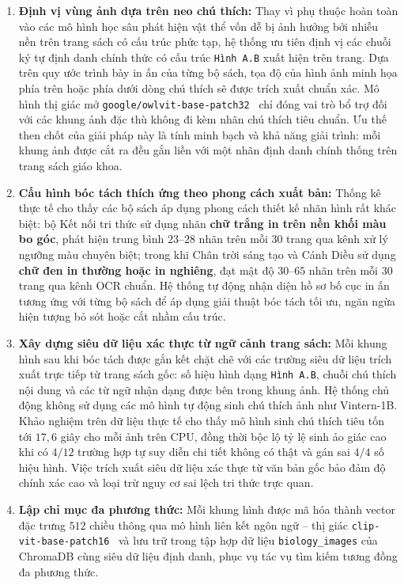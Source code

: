 \begin{enumerate}
    \item \textbf{Định vị vùng ảnh dựa trên neo chú thích:} Thay vì phụ thuộc hoàn toàn vào các mô hình học sâu phát hiện vật thể vốn dễ bị ảnh hưởng bởi nhiễu nền trên trang sách có cấu trúc phức tạp, hệ thống ưu tiên định vị các chuỗi ký tự định danh chính thức có cấu trúc \texttt{Hình A.B} xuất hiện trên trang. Dựa trên quy ước trình bày in ấn của từng bộ sách, tọa độ của hình ảnh minh họa phía trên hoặc phía dưới dòng chú thích sẽ được trích xuất chuẩn xác. Mô hình thị giác mở \texttt{google/owlvit-base-patch32}~\cite{minderer2022owlvit} chỉ đóng vai trò bổ trợ đối với các khung ảnh đặc thù không đi kèm nhãn chú thích tiêu chuẩn. Ưu thế then chốt của giải pháp này là tính minh bạch và khả năng giải trình: mỗi khung ảnh được cắt ra đều gắn liền với một nhãn định danh chính thống trên trang sách giáo khoa.
    \item \textbf{Cấu hình bóc tách thích ứng theo phong cách xuất bản:} Thống kê thực tế cho thấy các bộ sách áp dụng phong cách thiết kế nhãn hình rất khác biệt: bộ Kết nối tri thức sử dụng nhãn \textbf{chữ trắng in trên nền khối màu bo góc}, phát hiện trung bình $23$--$28$ nhãn trên mỗi $30$ trang qua kênh xử lý ngưỡng màu chuyên biệt; trong khi Chân trời sáng tạo và Cánh Diều sử dụng \textbf{chữ đen in thường hoặc in nghiêng}, đạt mật độ $30$--$65$ nhãn trên mỗi $30$ trang qua kênh OCR chuẩn. Hệ thống tự động nhận diện hồ sơ bố cục in ấn tương ứng với từng bộ sách để áp dụng giải thuật bóc tách tối ưu, ngăn ngừa hiện tượng bỏ sót hoặc cắt nhầm cấu trúc.
    \item \textbf{Xây dựng siêu dữ liệu xác thực từ ngữ cảnh trang sách:} Mỗi khung hình sau khi bóc tách được gắn kết chặt chẽ với các trường siêu dữ liệu trích xuất trực tiếp từ trang sách gốc: số hiệu hình dạng \texttt{Hình A.B}, chuỗi chú thích nội dung và các từ ngữ nhận dạng được bên trong khung ảnh. Hệ thống chủ động không sử dụng các mô hình tự động sinh chú thích ảnh như Vintern-1B. Khảo nghiệm trên dữ liệu thực tế cho thấy mô hình sinh chú thích tiêu tốn tới $17{,}6$ giây cho mỗi ảnh trên CPU, đồng thời bộc lộ tỷ lệ sinh ảo giác cao khi có $4/12$ trường hợp tự suy diễn chi tiết không có thật và gán sai $4/4$ số hiệu hình. Việc trích xuất siêu dữ liệu xác thực từ văn bản gốc bảo đảm độ chính xác cao và loại trừ nguy cơ sai lệch tri thức trực quan.
    \item \textbf{Lập chỉ mục đa phương thức:} Mỗi khung hình được mã hóa thành vector đặc trưng $512$ chiều thông qua mô hình liên kết ngôn ngữ -- thị giác \texttt{clip\allowbreak-vit\allowbreak-base\allowbreak-patch16}~\cite{radford2021clip} và lưu trữ trong tập hợp dữ liệu \texttt{biology\_\allowbreak images} của ChromaDB cùng siêu dữ liệu định danh, phục vụ tác vụ tìm kiếm tương đồng đa phương thức.
\end{enumerate}

